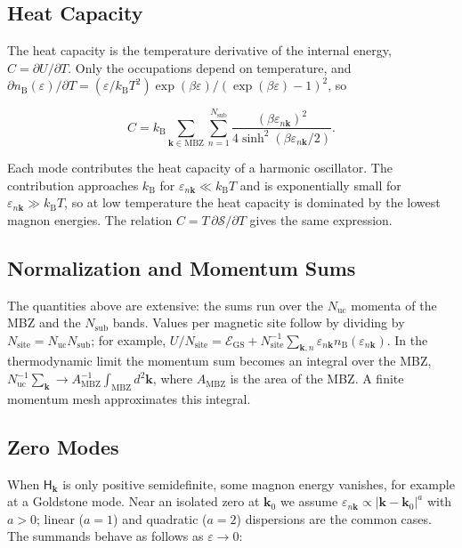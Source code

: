 \subsection{Heat Capacity}

The heat capacity is the temperature derivative of the internal energy, \(C=\partial U/\partial T\). Only the occupations depend on temperature, and \(\partial n_{\mathrm B}(\varepsilon)/\partial T=(\varepsilon/k_{\mathrm B}T^2)\exp(\beta\varepsilon)/(\exp(\beta\varepsilon)-1)^2\), so

\begin{equation}\label{eq-lswt-magnon-heat-capacity}
C=k_{\mathrm B}\sum_{\mathbf k\in\mathrm{MBZ}}\sum_{n=1}^{N_{\mathrm{sub}}}
\frac{(\beta\varepsilon_{n\mathbf k})^2}{4\sinh^2(\beta\varepsilon_{n\mathbf k}/2)}.
\end{equation}

Each mode contributes the heat capacity of a harmonic oscillator. The contribution approaches \(k_{\mathrm B}\) for \(\varepsilon_{n\mathbf k}\ll k_{\mathrm B}T\) and is exponentially small for \(\varepsilon_{n\mathbf k}\gg k_{\mathrm B}T\), so at low temperature the heat capacity is dominated by the lowest magnon energies. The relation \(C=T\,\partial\mathcal S/\partial T\) gives the same expression.

\subsection{Normalization and Momentum Sums}

The quantities above are extensive: the sums run over the \(N_{\mathrm{uc}}\) momenta of the MBZ and the \(N_{\mathrm{sub}}\) bands. Values per magnetic site follow by dividing by \(N_{\mathrm{site}}=N_{\mathrm{uc}}N_{\mathrm{sub}}\); for example, \(U/N_{\mathrm{site}}=\mathcal E_{\mathrm{GS}}+N_{\mathrm{site}}^{-1}\sum_{\mathbf k,n}\varepsilon_{n\mathbf k}n_{\mathrm B}(\varepsilon_{n\mathbf k})\). In the thermodynamic limit the momentum sum becomes an integral over the MBZ, \(N_{\mathrm{uc}}^{-1}\sum_{\mathbf k}\to A_{\mathrm{MBZ}}^{-1}\int_{\mathrm{MBZ}}d^2\mathbf k\), where \(A_{\mathrm{MBZ}}\) is the area of the MBZ. A finite momentum mesh approximates this integral.

\subsection{Zero Modes}

When \(\mathsf H_{\mathbf k}\) is only positive semidefinite, some magnon energy vanishes, for example at a Goldstone mode. Near an isolated zero at \(\mathbf k_0\) we assume \(\varepsilon_{n\mathbf k}\propto|\mathbf k-\mathbf k_0|^a\) with \(a>0\); linear (\(a=1\)) and quadratic (\(a=2\)) dispersions are the common cases. The summands behave as follows as \(\varepsilon\to0\):

